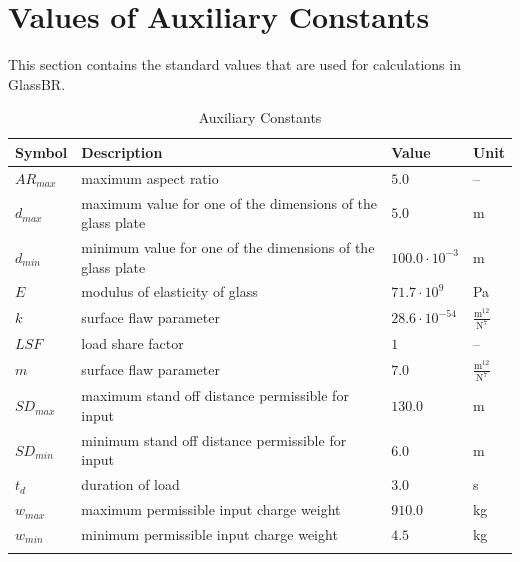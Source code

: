 \documentclass[12pt]{article}
\begin{document}
\section{Values of Auxiliary Constants}
\label{Sec:AuxConstants}
This section contains the standard values that are used for calculations in GlassBR.
\begin{longtabu}{l X[l] l l}
\toprule
Symbol & Description & Value & Unit
\\
\midrule
\endhead
${AR_{max}}$ & maximum aspect ratio & $5.0$ & --
\\
${d_{max}}$ & maximum value for one of the dimensions of the glass plate & $5.0$ & m
\\
${d_{min}}$ & minimum value for one of the dimensions of the glass plate & $100.0\cdot{}10^{-3}$ & m
\\
$E$ & modulus of elasticity of glass & $71.7\cdot{}10^{9}$ & Pa
\\
$k$ & surface flaw parameter & $28.6\cdot{}10^{-54}$ & $\frac{\text{m}^{12}}{\text{N}^{7}}$
\\
$LSF$ & load share factor & $1$ & --
\\
$m$ & surface flaw parameter & $7.0$ & $\frac{\text{m}^{12}}{\text{N}^{7}}$
\\
${SD_{max}}$ & maximum stand off distance permissible for input & $130.0$ & m
\\
${SD_{min}}$ & minimum stand off distance permissible for input & $6.0$ & m
\\
${t_{d}}$ & duration of load & $3.0$ & s
\\
${w_{max}}$ & maximum permissible input charge weight & $910.0$ & kg
\\
${w_{min}}$ & minimum permissible input charge weight & $4.5$ & kg
\\
\bottomrule
\caption{Auxiliary Constants}
\label{Table:TAuxConsts}
\end{longtabu}
\end{document}
